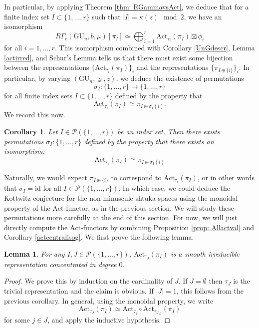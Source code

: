 \documentclass[reqno,11pt]{amsart}
\newtheorem{lemma}[theorem]{Lemma}
\newtheorem{corollary}[theorem]{Corollary}
\theoremstyle{remark}
\newcommand{\GU}{\mathrm{GU}}
\newcommand{\mc}{\mathcal}
\newcommand{\Act}{\mathrm{Act}}
\def\ra{\rightarrow}
\begin{document}
In particular, by applying Theorem \ref{thm: RGammavsAct}, we deduce that for a finite index set $I \subset \{1,\ldots,r\}$ such that $|I|= \kappa(z) \mod 2$, we have an isomorphism 
\[ R\Gamma_{c}(\GU_n,b,\mu)[\pi_{I}] \simeq \bigoplus_{i = 1}^{r} \Act_{\tau_{i}}(\pi_{I}) \boxtimes \phi_{i} \]
for all $i = 1,\ldots,r$. This isomorphism combined with Corollary \ref{UnGdescr}, Lemma \ref{actirred}, and Schur's Lemma tells us that there must exist some bijection between the representations $\{\Act_{\tau_{i}}(\pi_{I})\}_i$ and the representations $\{\pi_{I \oplus \{i\}}\}_i$. In particular, by varying $(\GU_n ,\varrho, z)$, we deduce the existence of permutations 
\[ \sigma_{I}: \{1,\ldots,r\} \ra \{1,\ldots,r\} \]
for all finite index sets $I \subset \{1,\ldots,r\}$ defined by the property that 
\[ \Act_{\tau_{i}}(\pi_{I}) \simeq \pi_{I \oplus \sigma_{I}(i)}. \]
We record this now.
\begin{corollary}{\label{cor: Actperm1}}
Let $I \in \mc{P}(\{1,\ldots,r\})$ be an index set. Then there exists permutations $\sigma_{I}: \{1,\ldots,r\}$ defined by the property that there exists an isomorphism:
\[ \Act_{\tau_{i}}(\pi_{I}) \simeq \pi_{I \oplus \sigma_{I}(i)} \]
\end{corollary}
Naturally, we would expect $\pi_{I \oplus \{i\}}$ to correspond to $\Act_{\tau_{i}}(\pi_{I})$, or in other words that $\sigma_{I} = \mathrm{id}$ for all $I \in \mc{P}(\{1,\ldots,r\})$. In which case, we could deduce the Kottwitz conjecture for the non-minuscule shtuka spaces using the monoidal property of the $\Act$-functor, as in the previous section. We will study these permutations more carefully at the end of this section. For now, we will just directly compute the $\Act$-functors by combining Proposition \ref{prop: Allactval} and Corollary \ref{actcentralisog}. We first prove the following lemma.
\begin{lemma}{\label{actirred2}}
For any $I,J \in \mc{P}(\{1,\ldots,r\})$, $\Act_{\tau_{J}}(\pi_{I})$ is a smooth irreducible representation concentrated in degree $0$.
\end{lemma}
\begin{proof}
We prove this by induction on the cardinality of $J$. If $J = \emptyset$ then $\tau_{J}$ is the trivial representation and the claim is obvious. If $|J| = 1$, this follows from the previous corollary. In general, using the monoidal property, we write 
\[ \Act_{\tau_{J}}(\pi_{I}) \simeq \Act_{\tau_{j}} \circ \Act_{\tau_{J \setminus j}}(\pi_{I}) \]
for some $j \in J$, and apply the inductive hypothesis. 
\end{proof}
\end{document}
